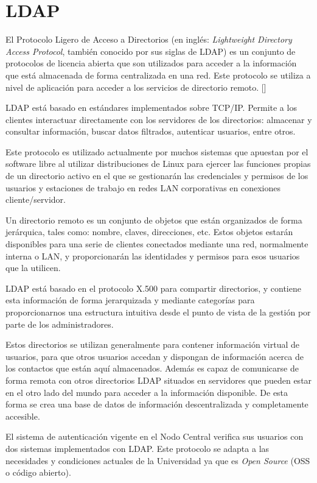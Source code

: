 \section{LDAP}
El Protocolo Ligero de Acceso a Directorios (en inglés: \textit{Lightweight Directory Access Protocol}, también conocido por sus siglas de LDAP) es un conjunto de protocolos de licencia abierta que son utilizados para acceder a la información que está almacenada de forma centralizada en una red. Este protocolo se utiliza a nivel de aplicación para acceder a los servicios de directorio remoto. [\cite{ldap-doc}]

LDAP está basado en estándares implementados sobre TCP/IP. Permite a los clientes interactuar directamente con los servidores de los directorios: almacenar y consultar información, buscar datos filtrados, autenticar usuarios, entre otros.

Este protocolo es utilizado actualmente por muchos sistemas que apuestan por el software libre al utilizar distribuciones de Linux para ejercer las funciones propias de un directorio activo en el que se gestionarán las credenciales y permisos de los usuarios y estaciones de trabajo en redes LAN corporativas en conexiones cliente/servidor.

Un directorio remoto es un conjunto de objetos que están organizados de forma jerárquica, tales como: nombre, claves, direcciones, etc. Estos objetos estarán disponibles para una serie de clientes conectados mediante una red, normalmente interna o LAN, y proporcionarán las identidades y permisos para esos usuarios que la utilicen.

LDAP está basado en el protocolo X.500 para compartir directorios, y contiene esta información de forma jerarquizada y mediante categorías para proporcionarnos una estructura intuitiva desde el punto de vista de la gestión por parte de los administradores.

Estos directorios se utilizan generalmente para contener información virtual de usuarios, para que otros usuarios accedan y dispongan de información acerca de los contactos que están aquí almacenados. Además es capaz de comunicarse de forma remota con otros directorios LDAP situados en servidores que pueden estar en el otro lado del mundo para acceder a la información disponible. De esta forma se crea una base de datos de información descentralizada y completamente accesible.
 
El sistema de autenticación vigente en el Nodo Central verifica sus usuarios con dos sistemas implementados con LDAP. Este protocolo se adapta a las necesidades y condiciones actuales de la Universidad ya que es \textit{Open Source} (OSS o código abierto).


